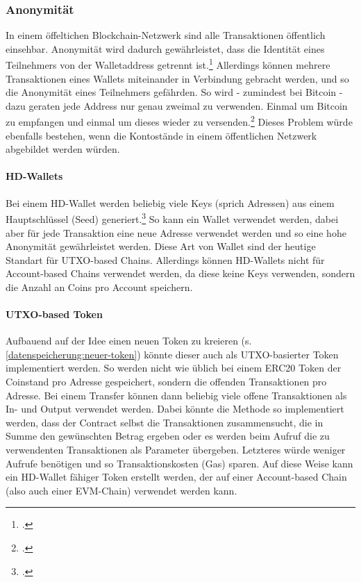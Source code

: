 \subsubsection{Anonymität}
In einem öffeltichen Blockchain-Netzwerk sind alle Transaktionen öffentlich einsehbar.
Anonymität wird dadurch gewährleistet, dass die Identität eines Teilnehmers von der Walletaddress getrennt ist.\footcite[Vgl.][6]{q4}
Allerdings können mehrere Transaktionen eines Wallets miteinander in Verbindung gebracht werden, und so die Anonymität eines Teilnehmers gefährden. So wird - zumindest bei Bitcoin - dazu geraten jede Address nur genau zweimal zu verwenden. Einmal um Bitcoin zu empfangen und einmal um dieses wieder zu versenden.\footcite[Vgl.][]{w15}
Dieses Problem würde ebenfalls bestehen, wenn die Kontostände in einem öffentlichen Netzwerk abgebildet werden würden.



\paragraph{HD-Wallets}
Bei einem HD-Wallet werden beliebig viele Keys (sprich Adressen) aus einem Hauptschlüssel (Seed) generiert.\footcite[Vgl. hierzu und weiterführend][S. 8 ff\adddot]{q9}
So kann ein Wallet verwendet werden, dabei aber für jede Transaktion eine neue Adresse verwendet werden und so eine hohe Anonymität gewährleistet werden.
Diese Art von Wallet sind der heutige Standart für UTXO-based Chains.
Allerdings können HD-Wallets nicht für Account-based Chains verwendet werden, da diese keine Keys verwenden, sondern die Anzahl an Coins pro Account speichern.

\paragraph{UTXO-based Token}
Aufbauend auf der Idee einen neuen Token zu kreieren (s. \ref{datenspeicherung:neuer-token}) könnte dieser auch als UTXO-basierter Token implementiert werden.
So werden nicht wie üblich bei einem ERC20 Token der Coinstand pro Adresse gespeichert, sondern die offenden Transaktionen pro Adresse.
Bei einem Transfer können dann beliebig viele offene Transaktionen als In- und Output verwendet werden.
Dabei könnte die Methode so implementiert werden, dass der Contract selbst die Transaktionen zusammensucht, die in Summe den gewünschten Betrag ergeben oder es werden beim Aufruf die zu verwendenten Transaktionen als Parameter übergeben.
Letzteres würde weniger Aufrufe benötigen und so Transaktionskosten (Gas) sparen.
Auf diese Weise kann ein HD-Wallet fähiger Token erstellt werden, der auf einer Account-based Chain (also auch einer EVM-Chain) verwendet werden kann.